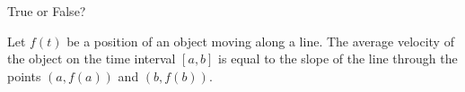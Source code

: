 \documentclass{ximera}
\author{Gregory Hartman \and Matthew Carr}
\begin{document}
\begin{exercise}




True or False?

Let $f(t)$ be a position of an object moving along a line. The average velocity of the object on the time interval $[a,b]$ is equal to  the slope of the line through the points $\left(a,f(a)\right)$ and $\left(b,f(b)\right)$.


\begin{prompt}
\begin{multipleChoice}
\end{multipleChoice}
\end{prompt}


\end{exercise}
\end{document}
